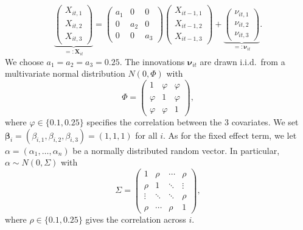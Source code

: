 \documentclass[12pt]{article}
\begin{document}
\[ \underbrace{\begin{pmatrix} X_{it,1} \\ X_{it,2} \\ X_{it,3} \end{pmatrix}}_{=: \boldsymbol{X}_{it}} = \begin{pmatrix} a_1 & 0 & 0 \\ 0 & a_2 & 0 \\ 0 & 0 & a_3 \end{pmatrix} \begin{pmatrix} X_{it-1,1} \\ X_{it-1,2} \\ X_{it-1,3} \end{pmatrix} + \underbrace{\begin{pmatrix} \nu_{it,1} \\ \nu_{it,2} \\ \nu_{it,3} \end{pmatrix}}_{=: \boldsymbol{\nu}_{it}}. \] 
We choose $a_1 = a_2 = a_3 = 0.25$. The innovations $\boldsymbol{\nu}_{it}$ are drawn i.i.d.\ from a multivariate normal distribution $N(0,\Phi)$ with
\[ \Phi = \begin{pmatrix} 1 & \varphi & \varphi \\ \varphi & 1 & \varphi \\ \varphi & \varphi & 1 \end{pmatrix}, \]
where $\varphi \in \{0.1, 0.25\}$ specifies the correlation between the 3 covariates. We set $\boldsymbol{\beta}_i = (\beta_{i,1},\beta_{i,2},\beta_{i,3}) = (1,1,1)$ for all $i$. As for the fixed effect term, we let $\alpha = (\alpha_1,\ldots,\alpha_n)$ be a normally distributed random vector. In particular, $\alpha \sim N(0,\Sigma)$ with
\[ \Sigma =
\begin{pmatrix}
1      & \rho   & \cdots & \rho   \\
\rho   & 1      & \ddots & \vdots \\
\vdots & \ddots & \ddots & \rho   \\
\rho   & \cdots & \rho   & 1
\end{pmatrix},
\]
where $\rho \in \{0.1, 0.25\}$ gives the correlation across $i$.
\end{document}
